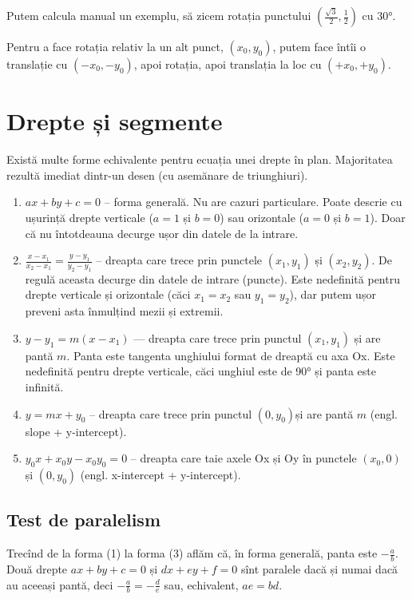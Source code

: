 \documentclass[../main.tex]{subfiles}
\begin{document}
Putem calcula manual un exemplu, să zicem rotația punctului $(\frac{\sqrt{3}}{2}, \frac{1}{2})$ cu 30°.

Pentru a face rotația relativ la un alt punct, $(x_0, y_0)$, putem face întîi o translație cu $(-x_0, -y_0)$, apoi rotația, apoi translația la loc cu $(+x_0, +y_0)$.

\section{Drepte și segmente}

Există multe forme echivalente pentru ecuația unei drepte în plan. Majoritatea rezultă imediat dintr-un desen (cu asemănare de triunghiuri).

\begin{enumerate}
  \item $ax + by + c = 0$ -- forma generală. Nu are cazuri particulare. Poate descrie cu ușurință drepte verticale ($a = 1$ și $b = 0$) sau orizontale ($a = 0$ și $b = 1$). Doar că nu întotdeauna decurge ușor din datele de la intrare.

  \item $\frac{x - x_1}{x_2 - x_1} = \frac{y - y_1}{y_2 - y_1}$ -- dreapta care trece prin punctele $(x_1, y_1)$ și $(x_2, y_2)$. De regulă aceasta decurge din datele de intrare (puncte). Este nedefinită pentru drepte verticale și orizontale (căci $x_1 = x_2$ sau $y_1 = y_2$), dar putem ușor preveni asta înmulțind mezii și extremii.

  \item $y - y_1 = m(x - x_1)$ --- dreapta care trece prin punctul $(x_1, y_1)$ și are pantă $m$. Panta este tangenta unghiului format de dreaptă cu axa Ox. Este nedefinită pentru drepte verticale, căci unghiul este de 90° și panta este infinită.

  \item $y = m x + y_0$ -- dreapta care trece prin punctul $(0, y_0)$și are pantă $m$ (engl. slope + y-intercept).

  \item $y_0 x + x_0 y - x_0 y_0 = 0$ -- dreapta care taie axele Ox și Oy în punctele $(x_0, 0)$ și $(0, y_0)$ (engl. x-intercept + y-intercept).
\end{enumerate}

\subsection{Test de paralelism}

Trecînd de la forma (1) la forma (3) aflăm că, în forma generală, panta este $- \frac{a}{b}$. Două drepte $ax + by + c = 0$ și $dx + ey + f = 0$ sînt paralele dacă și numai dacă au aceeași pantă, deci $- \frac{a}{b} = - \frac{d}{e}$ sau, echivalent, $ae = bd$.
\end{document}
